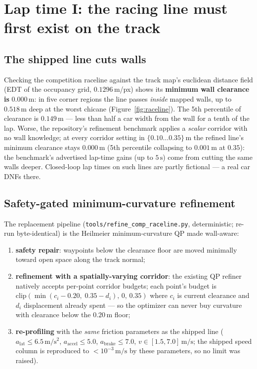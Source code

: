 \documentclass[11pt]{article}
\newcommand{\m}[1]{$#1\,\mathrm{m}$}
\begin{document}
\section{Lap time I: the racing line must first exist on the track}
\label{sec:raceline}

\subsection{The shipped line cuts walls}

Checking the competition raceline against the track map's euclidean
distance field (EDT of the occupancy grid, $0.1296\,\mathrm{m}$/px)
shows its \textbf{minimum wall clearance is} \m{0.000}: in five corner
regions the line passes \emph{inside} mapped walls, up to \m{0.518}
deep at the worst chicane (Figure~\ref{fig:raceline}).  The 5th
percentile of clearance is \m{0.149} --- less than half a car width
from the wall for a tenth of the lap.  Worse, the repository's
refinement benchmark applies a \emph{scalar} corridor with no wall
knowledge; at every corridor setting in $\{0.10\ldots0.35\}\,\mathrm{m}$
the refined line's minimum clearance stays \m{0.000} (5th percentile
collapsing to \m{0.001} at $0.35$): the benchmark's advertised lap-time
gains (up to $5\,\mathrm{s}$) come from cutting the same walls deeper.
Closed-loop lap times on such lines are partly fictional --- a real car
DNFs there.

\subsection{Safety-gated minimum-curvature refinement}

The replacement pipeline (\texttt{tools/refine\_comp\_raceline.py},
deterministic; re-run byte-identical) is the Heilmeier
minimum-curvature QP \cite{heilmeier,tumftm} made wall-aware:
\begin{enumerate}
  \item \textbf{safety repair}: waypoints below the clearance floor are
        moved minimally toward open space along the track normal;
  \item \textbf{refinement with a spatially-varying corridor}: the
        existing QP refiner natively accepts per-point corridor
        budgets; each point's budget is
        $\mathrm{clip}\!\left(\min(c_i - 0.20, \; 0.35 - d_i),\,
        0,\, 0.35\right)$ where $c_i$ is current clearance and $d_i$
        displacement already spent --- so the optimizer can never buy
        curvature with clearance below the \m{0.20} floor;
  \item \textbf{re-profiling} with the \emph{same} friction parameters
        as the shipped line ($a_{\mathrm{lat}} \le 6.5\,\mathrm{m/s^2}$,
        $a_{\mathrm{accel}} \le 5.0$, $a_{\mathrm{brake}} \le 7.0$,
        $v \in [1.5, 7.0]\,\mathrm{m/s}$; the shipped speed column is
        reproduced to $<10^{-3}\,\mathrm{m/s}$ by these parameters, so
        no limit was raised).
\end{enumerate}
\end{document}
